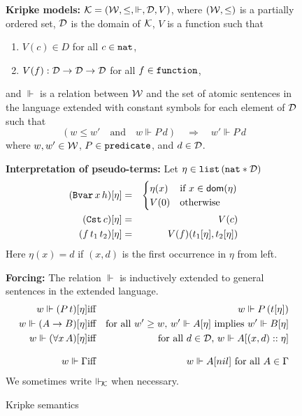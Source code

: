 \documentclass{svjour3}                     %
\newcommand{\cald}{{\cal D}}
\newcommand{\calk}{{\cal K}}
\newcommand{\calw}{{\cal W}}
\newcommand{\Ga}{\Gamma}
\newcommand{\Vd}{\Vdash}
\newcommand{\dom}{\mathrm{\textsf{dom}}}
\newcommand{\tBvar}{\textup{\tt Bvar}}
\newcommand{\tCst}{\textup{\tt Cst}}
\newcommand{\tFvar}{\textup{\tt Fvar}}
\newcommand{\tnat}{\textup{\tt nat}}
\newcommand{\tfunction}{\textup{\tt function}}
\newcommand{\tpredicate}{\textup{\tt predicate}}
\newcommand{\tlist}{\textup{\tt list}}
\begin{document}
\begin{figure}[t]
\textbf{Kripke models:} $\calk = (\calw, \le,\Vd , \cald, V )$, where $(\calw, \le)$ is a partially ordered set, $\cald$ is the domain of $\calk$, $V$ is a function such that
\begin{enumerate}
\item $V(c) \in D$ for all $c \in \tnat$,
\item $V(f) : \cald \to \cald \to \cald$ for all $f \in \tfunction$,
\end{enumerate}
and $\Vd$ is a relation between $\calw$ and the set of atomic sentences in the language extended with constant symbols for each element of $\cald$ such that
\[
(w \le w' \quad \text{and} \quad w \Vd P\, d)\quad \Rightarrow\quad  w' \Vd P\,d
\]
where $w, w' \in \calw$, $P \in \tpredicate$, and $d \in \cald$.\medskip

\textbf{Interpretation of pseudo-terms:} Let $\eta \in \tlist\, (\tnat \ast \cald)$
\begin{eqnarray}
  (\tBvar\, x\, h) [\eta] & = &
  \begin{cases}
    \eta(x) & \text{if } x\in \dom(\eta)\\
    V(0) & \text{otherwise}
  \end{cases}\nonumber\\
  (\tCst\, c) [\eta] & = & V(c) \label{kripke-cst}\\
  (f\, t_1\, t_2 ) [\eta] & = & V(f)(t_1 [\eta], t_2 [\eta])\nonumber
\end{eqnarray}
Here $\eta(x) = d$ if $(x,d)$ is the first occurrence in $\eta$ from left.\medskip

\textbf{Forcing:} The relation $\Vd$ is inductively extended to general sentences in the extended language.
\begin{eqnarray}
  w \Vd (P\, t)[\eta] & \text{iff} & w \Vd P\, (t[\eta]) \nonumber\\
  w \Vd (A \to B)[\eta] & \text{iff} & \text{for all $w' \ge w$, $w' \Vd A [\eta]$ implies $w' \Vd B[\eta]$} \nonumber\\
  w \Vd (\forall x\,  A)[\eta] & \text{iff} & \text{for all $d \in \cald$, $w\Vd A [(x, d) :: \eta]$} \label{kripke-all} \\[2ex]
  w \Vd \Ga & \text{iff} & \text{$w \Vd A [nil]$ for all $A \in \Ga$} \nonumber
\end{eqnarray}
We sometimes write $\Vd_{\!\calk}$ when necessary.

\hrulefill
  \caption{Kripke semantics}
  \label{fig:kripke}
\end{figure}
\end{document}
